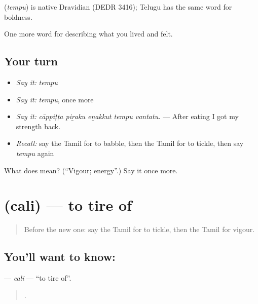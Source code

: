 \begin{cousinweb}
\textbf{} (\emph{tempu}) is native Dravidian (DEDR 3416); Telugu has the same word for boldness.
\end{cousinweb}

\begin{grammarlens}[title={What you've built}]
One more word for describing what you lived and felt.
\end{grammarlens}

\subsection*{Your turn}
\begin{itemize}
\raggedright
  \item \emph{Say it:} \emph{tempu}
  \item \emph{Say it:} \emph{tempu}, once more
  \item \emph{Say it:} \emph{cāppiṭṭa piṟaku eṉakkut tempu vantatu.} — After eating I got my strength back.
  \item \emph{Recall:} say the Tamil for to babble, then the Tamil for to tickle, then say \emph{tempu} again
\end{itemize}

\begin{tcolorbox}[breakable,colback=teal!4,colframe=teal!35!black,title={Before you move on}]
What does  mean? (\textquotedblleft{}Vigour; energy\textquotedblright{}.) Say it once more.
\end{tcolorbox}
\section[\texorpdfstring{\ta{சலி} (cali)}{சலி (cali)}]{ (cali) — to tire of}

\label{lesson:TA-C468-cali}



\begin{quote}
Before the new one: say the Tamil for to tickle, then the Tamil for vigour.
\end{quote}

\subsection*{You'll want to know: }
\textbf{} — \emph{cali} — \textquotedblleft{}to tire of\textquotedblright{}.

\begin{quote}
   .
\end{quote}

